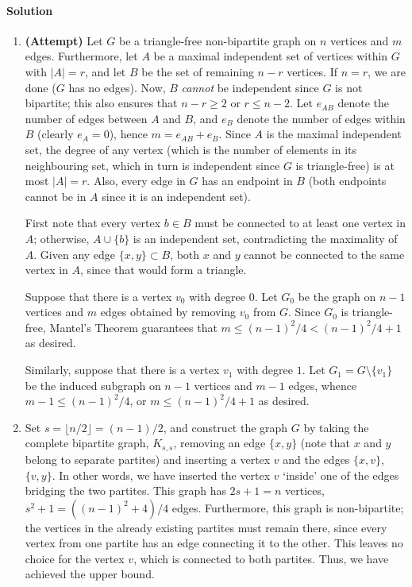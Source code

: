 \documentclass[10pt]{article}
\newcommand{\solution}{\paragraph{Solution}}
\begin{document}
    \solution \mbox{}
    \begin{enumerate}
        \item \textbf{(Attempt)}
        Let $G$ be a triangle-free non-bipartite graph on $n$ vertices and $m$ edges.
        Furthermore, let $A$ be a maximal independent set of vertices within $G$ with
        $|A| = r$, and let $B$ be the set of remaining $n - r$ vertices.  If $n = r$,
        we are done ($G$ has no edges). Now, $B$ \emph{cannot} be independent since
        $G$ is not bipartite; this also ensures that $n - r \geq 2$ or $r \leq n -
        2$. Let $e_{AB}$ denote the number of edges between $A$ and $B$, and $e_{B}$
        denote the number of edges within $B$ (clearly $e_A = 0$), hence $m = e_{AB}
        + e_B$. Since $A$ is the maximal independent set, the degree of any vertex
        (which is the number of elements in its neighbouring set, which in turn is
        independent since $G$ is triangle-free) is at most $|A| = r$. Also, every
        edge in $G$ has an endpoint in $B$ (both endpoints cannot be in $A$ since it
        is an independent set).

        First note that every vertex $b \in B$ must be connected to at least one
        vertex in $A$; otherwise, $A\cup \{b\}$ is an independent set, contradicting
        the maximality of $A$. Given any edge $\{x, y\} \subset B$, both $x$ and $y$
        cannot be connected to the same vertex in $A$, since that would form a
        triangle.

        Suppose that there is a vertex $v_0$ with degree $0$. Let $G_0$ be the graph
        on $n - 1$ vertices and $m$ edges obtained by removing $v_0$ from $G$. Since
        $G_0$ is triangle-free, Mantel's Theorem guarantees that $m \leq (n - 1)^2 /
        4 < (n - 1)^2 / 4 + 1$ as desired.

        Similarly, suppose that there is a vertex $v_1$ with degree $1$. Let $G_1 =
        G\setminus\{v_1\}$ be the induced subgraph on $n - 1$ vertices and $m - 1$
        edges, whence $m - 1 \leq (n - 1)^2 / 4$, or $m \leq (n - 1)^2 / 4 + 1$ as
        desired.

        \item Set $s = \lfloor n / 2\rfloor = (n - 1) / 2$, and construct the graph
        $G$ by taking the complete bipartite graph, $K_{s, s}$, removing an edge
        $\{x, y\}$ (note that $x$ and $y$ belong to separate partites) and inserting
        a vertex $v$ and the edges $\{x, v\}$, $\{v, y\}$. In other words, we have
        inserted the vertex $v$ `inside' one of the edges bridging the two partites.
        This graph has $2s + 1 = n$ vertices, $s^2 + 1 = ((n - 1)^2 + 4) / 4$ edges.
        Furthermore, this graph is non-bipartite; the vertices in the already
        existing partites must remain there, since every vertex from one partite has
        an edge connecting it to the other. This leaves no choice for the vertex $v$,
        which is connected to both partites. Thus, we have achieved the upper bound.
    \end{enumerate} 
\end{document}
